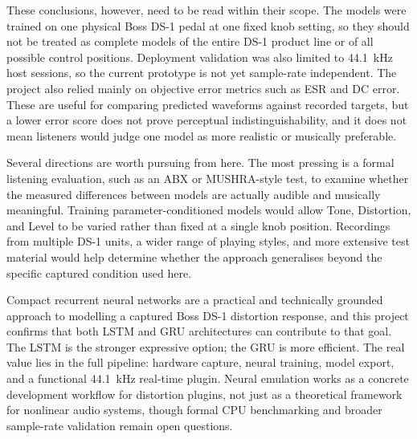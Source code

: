 These conclusions, however, need to be read within their scope. The models were trained on one physical Boss DS-1 pedal at one fixed knob setting, so they should not be treated as complete models of the entire DS-1 product line or of all possible control positions. Deployment validation was also limited to 44.1~kHz host sessions, so the current prototype is not yet sample-rate independent. The project also relied mainly on objective error metrics such as ESR and DC error. These are useful for comparing predicted waveforms against recorded targets, but a lower error score does not prove perceptual indistinguishability, and it does not mean listeners would judge one model as more realistic or musically preferable.

Several directions are worth pursuing from here. The most pressing is a formal listening evaluation, such as an ABX or MUSHRA-style test, to examine whether the measured differences between models are actually audible and musically meaningful. Training parameter-conditioned models would allow Tone, Distortion, and Level to be varied rather than fixed at a single knob position. Recordings from multiple DS-1 units, a wider range of playing styles, and more extensive test material would help determine whether the approach generalises beyond the specific captured condition used here.

Compact recurrent neural networks are a practical and technically grounded approach to modelling a captured Boss DS-1 distortion response, and this project confirms that both LSTM and GRU architectures can contribute to that goal. The LSTM is the stronger expressive option; the GRU is more efficient. The real value lies in the full pipeline: hardware capture, neural training, model export, and a functional 44.1~kHz real-time plugin. Neural emulation works as a concrete development workflow for distortion plugins, not just as a theoretical framework for nonlinear audio systems, though formal CPU benchmarking and broader sample-rate validation remain open questions.
